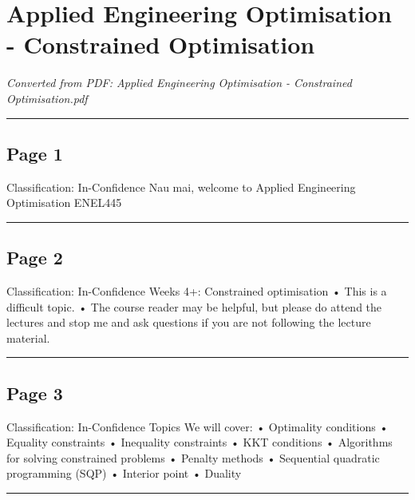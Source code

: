\documentclass[
]{article}
\author{}
\date{}
\begin{document}
\section{Applied Engineering Optimisation - Constrained
Optimisation}\label{applied-engineering-optimisation---constrained-optimisation}

\emph{Converted from PDF: Applied Engineering Optimisation - Constrained
Optimisation.pdf}

\begin{center}\rule{0.5\linewidth}{0.5pt}\end{center}

\subsection{Page 1}\label{page-1}

Classification: In-Confidence Nau mai, welcome to Applied Engineering
Optimisation ENEL445

\begin{center}\rule{0.5\linewidth}{0.5pt}\end{center}

\subsection{Page 2}\label{page-2}

Classification: In-Confidence Weeks 4+: Constrained optimisation • This
is a difficult topic. • The course reader may be helpful, but please do
attend the lectures and stop me and ask questions if you are not
following the lecture material.

\begin{center}\rule{0.5\linewidth}{0.5pt}\end{center}

\subsection{Page 3}\label{page-3}

Classification: In-Confidence Topics We will cover: • Optimality
conditions • Equality constraints • Inequality constraints • KKT
conditions • Algorithms for solving constrained problems • Penalty
methods • Sequential quadratic programming (SQP) • Interior point •
Duality

\begin{center}\rule{0.5\linewidth}{0.5pt}\end{center}
\end{document}
